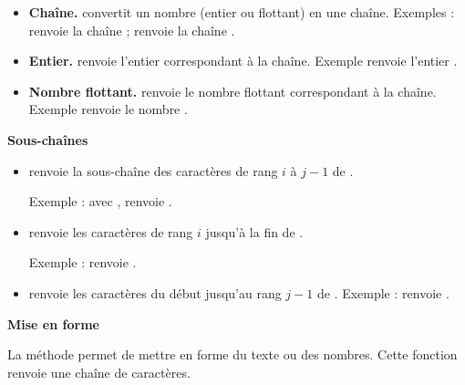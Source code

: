 \documentclass[11pt,class=report,crop=false]{standalone}
\begin{document}
\begin{itemize}
  \item \textbf{Chaîne.} \quad convertit un nombre (entier ou flottant) en une chaîne.
  Exemples :  renvoie la chaîne  ;  renvoie la chaîne .
  
  \item \textbf{Entier.} \quad renvoie l'entier correspondant à la chaîne. Exemple  renvoie l'entier .
  
   \item \textbf{Nombre flottant.} \quad renvoie le nombre flottant correspondant à la chaîne. Exemple  renvoie le nombre . 
 \end{itemize}  


\bigskip

\textbf{Sous-chaînes}

\begin{itemize}
  \item {}\quad renvoie la sous-chaîne des caractères de rang $i$ à $j-1$ de .
  
   Exemple : avec ,  renvoie .
   
  \item {}\quad renvoie les caractères de rang $i$ jusqu'à la fin de . 
  
  Exemple :
   renvoie .
  
  \item{}\quad renvoie les caractères du début jusqu'au rang $j-1$ de . Exemple :
   renvoie .
  
\end{itemize}


\bigskip
\textbf{Mise en forme}

La méthode  permet de mettre en forme du texte ou des nombres. Cette fonction renvoie une chaîne de caractères.
\end{document}
